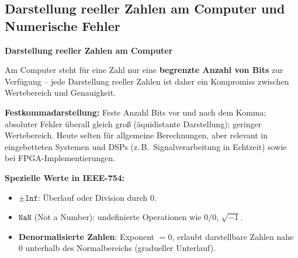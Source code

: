 \subsection{Darstellung reeller Zahlen am Computer und Numerische Fehler}

\textbf{Darstellung reeller Zahlen am Computer}

Am Computer steht für eine Zahl nur eine \textbf{begrenzte Anzahl von Bits} zur Verfügung -- jede Darstellung reeller Zahlen ist daher ein Kompromiss zwischen Wertebereich und Genauigkeit.

\textbf{Festkommadarstellung:} Feste Anzahl Bits vor und nach dem Komma; absoluter Fehler überall gleich groß (äquidistante Darstellung); geringer Wertebereich. Heute selten für allgemeine Berechnungen, aber relevant in eingebetteten Systemen und DSPs (z.\,B.\ Signalverarbeitung in Echtzeit) sowie bei FPGA-Implementierungen.


\textbf{Spezielle Werte in IEEE-754:}
\begin{itemize}[leftmargin=1.5em]
    \item $\pm\texttt{Inf}$: Überlauf oder Division durch $0$.
    \item $\texttt{NaN}$ (Not a Number): undefinierte Operationen wie $0/0$, $\sqrt{-1}$.
    \item \textbf{Denormalisierte Zahlen}: Exponent $= 0$, erlaubt darstellbare Zahlen nahe $0$ unterhalb des Normalbereichs (gradueller Unterlauf).
\end{itemize}

